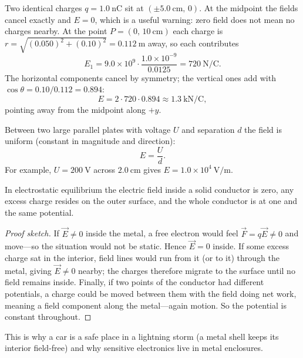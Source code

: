 \begin{example}\label{exm:two-fields}
Two identical charges $q = 1.0\ \mathrm{nC}$ sit at $(\pm 5.0\ \mathrm{cm},\,0)$. At the midpoint the fields cancel exactly and $E = 0$, which is a useful warning: zero field does not mean no charges nearby. At the point $P = (0,\,10\ \mathrm{cm})$ each charge is $r = \sqrt{(0.050)^2 + (0.10)^2} = 0.112\ \mathrm{m}$ away, so each contributes
\[
  E_1 = 9.0\times 10^{9}\cdot\frac{1.0\times 10^{-9}}{0.0125} = 720\ \mathrm{N/C}.
\]
The horizontal components cancel by symmetry; the vertical ones add with $\cos\theta = 0.10/0.112 = 0.894$:
\[
  E = 2\cdot 720\cdot 0.894 \approx 1.3\ \mathrm{kN/C},
\]
pointing away from the midpoint along $+y$.
\end{example}

Between two large parallel plates with voltage $U$ and separation $d$ the field is uniform (constant in magnitude and direction):
\begin{equation}\label{eq:uniform-field}
  E = \frac{U}{d}.
\end{equation}
For example, $U = 200\ \mathrm{V}$ across $2.0\ \mathrm{cm}$ gives $E = 1.0\times 10^{4}\ \mathrm{V/m}$.

\begin{theorem}\label{thm:conductor}
In electrostatic equilibrium the electric field inside a solid conductor is zero, any excess charge resides on the outer surface, and the whole conductor is at one and the same potential.
\end{theorem}

\begin{proof}[Proof sketch]
If $\vec{E}\neq 0$ inside the metal, a free electron would feel $\vec{F} = q\vec{E}\neq 0$ and move---so the situation would not be static. Hence $\vec{E} = 0$ inside. If some excess charge sat in the interior, field lines would run from it (or to it) through the metal, giving $\vec{E}\neq 0$ nearby; the charges therefore migrate to the surface until no field remains inside. Finally, if two points of the conductor had different potentials, a charge could be moved between them with the field doing net work, meaning a field component along the metal---again motion. So the potential is constant throughout.
\end{proof}

This is why a car is a safe place in a lightning storm (a metal shell keeps its interior field-free) and why sensitive electronics live in metal enclosures.

